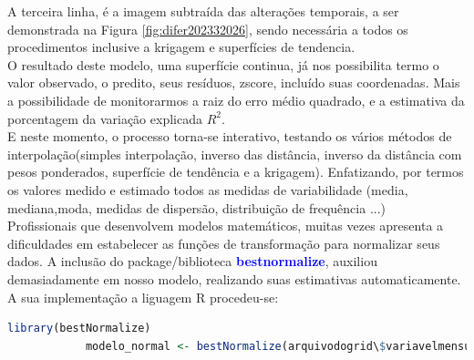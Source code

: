 		\hspace*{1.25 cm}  A terceira linha, é a imagem subtraída das alterações temporais, a ser demonstrada na Figura \ref{fig:difer202332026}, sendo necessária a todos os procedimentos inclusive a krigagem e superfícies de tendencia.\\
		\hspace*{1.25 cm}  O resultado deste modelo, uma superfície continua, já nos possibilita termo o valor observado, o predito, seus resíduos, zscore, incluído suas coordenadas. Mais a possibilidade de monitorarmos a raiz do erro médio quadrado, e a estimativa da porcentagem da variação explicada $ R^{2}$.\\
		\hspace*{1.25 cm}  E neste momento, o processo torna-se interativo, testando os vários métodos de interpolação(simples interpolação, inverso das distância, inverso da distância com pesos ponderados, superfície de tendência e a krigagem). Enfatizando, por  termos os valores medido e estimado todos as medidas de variabilidade (media, mediana,moda, medidas de dispersão, distribuição de frequência ...)  \\
		\hspace*{1.25 cm}  Profissionais que desenvolvem modelos matemáticos, muitas vezes apresenta a dificuldades em estabelecer as funções de transformação para normalizar seus dados. A inclusão  do package/biblioteca \textbf{\textcolor{blue}{bestnormalize}}, auxiliou demasiadamente em nosso modelo, realizando suas estimativas automaticamente. A sua implementação a liguagem R procedeu-se:
		\lstset{
			language=R, %
			caption= normalizacao do modelo em linguagem R,} %
		\begin{lstlisting}[language=R]
			library(bestNormalize)
			modelo_normal <- bestNormalize(arquivodogrid\$variavelmensurada )
		\end{lstlisting}  
		
